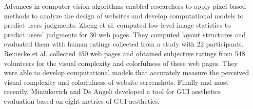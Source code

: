 Advances in computer vision algorithms enabled researchers to
apply pixel-based methods to analyze the design of websites and develop computational models to predict users judgments.
Zheng et al. \cite{zheng_2009_CHI_correlating} computed low-level image statistics to predict users' judgments for 30 web pages.
They computed layout structures and evaluated them with human ratings collected from a study with 22 participants.
Reinecke et al. \cite{reinecke_2013_CHI} collected 450 web pages and obtained subjective ratings from 548 volunteers for the visual complexity and colorfulness of these web pages.
They were able to develop computational models that accurately measure the perceived visual complexity and colorfulness of website screenshots.
Finally and most recently, Miniukovich and De Angeli \cite{Miniukovich_CHI_2015} developed a tool for GUI aesthetics evaluation based on eight metrics of GUI aesthetics.
